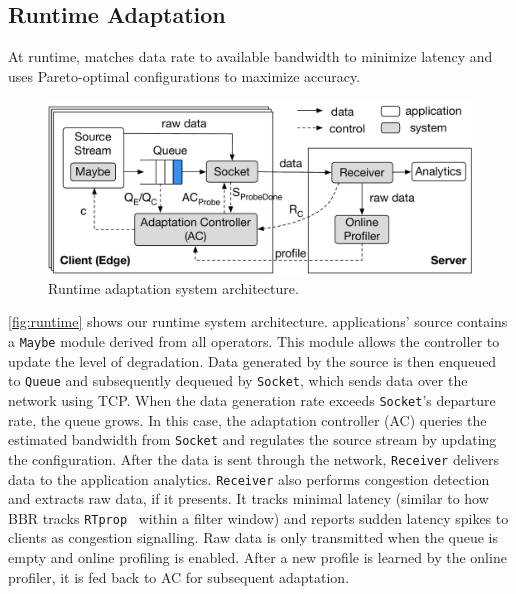 \subsection{Runtime Adaptation}
\label{sec:runtime}

At runtime, \sysname{} matches data rate to available bandwidth to minimize
latency and uses Pareto-optimal configurations to maximize accuracy.

\begin{figure}
  \centering
  \includegraphics[width=\linewidth]{figures/runtime-adaptation.pdf}
  \caption{Runtime adaptation system architecture.}
  \label{fig:runtime}
\end{figure}

\autoref{fig:runtime} shows our runtime system architecture. \sysname{}
applications' source contains a \texttt{Maybe} module derived from all \maybe{}
operators. This module allows the controller to update the level of
degradation. Data generated by the source is then enqueued to \texttt{Queue} and
subsequently dequeued by \texttt{Socket}, which sends data over the network
using TCP. When the data generation rate exceeds \texttt{Socket}'s departure
rate, the queue grows. In this case, the adaptation controller (AC) queries the
estimated bandwidth from \texttt{Socket} and regulates the source stream by
updating the configuration. After the data is sent through the network,
\texttt{Receiver} delivers data to the application analytics. \texttt{Receiver}
also performs congestion detection and extracts raw data, if it presents.  It
tracks minimal latency (similar to how BBR tracks
\texttt{RTprop}~\cite{cardwell2017bbr} within a filter window) and reports
sudden latency spikes to clients as congestion signalling. Raw data is only
transmitted when the queue is empty and online profiling is enabled. After a new
profile is learned by the online profiler, it is fed back to AC for subsequent
adaptation.

